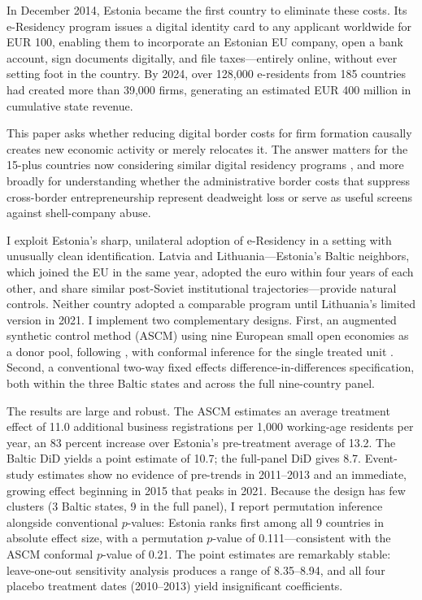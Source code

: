 \documentclass[12pt]{article}
\begin{document}
In December 2014, Estonia became the first country to eliminate these costs. Its e-Residency program issues a digital identity card to any applicant worldwide for EUR 100, enabling them to incorporate an Estonian EU company, open a bank account, sign documents digitally, and file taxes---entirely online, without ever setting foot in the country. By 2024, over 128,000 e-residents from 185 countries had created more than 39,000 firms, generating an estimated EUR 400 million in cumulative state revenue.

This paper asks whether reducing digital border costs for firm formation causally creates new economic activity or merely relocates it. The answer matters for the 15-plus countries now considering similar digital residency programs \citep{oecd2020digital}, and more broadly for understanding whether the administrative border costs that suppress cross-border entrepreneurship represent deadweight loss or serve as useful screens against shell-company abuse.

I exploit Estonia's sharp, unilateral adoption of e-Residency in a setting with unusually clean identification. Latvia and Lithuania---Estonia's Baltic neighbors, which joined the EU in the same year, adopted the euro within four years of each other, and share similar post-Soviet institutional trajectories---provide natural controls. Neither country adopted a comparable program until Lithuania's limited version in 2021. I implement two complementary designs. First, an augmented synthetic control method (ASCM) using nine European small open economies as a donor pool, following \citet{benmelech2021}, with conformal inference for the single treated unit \citep{chernozhukov2021}. Second, a conventional two-way fixed effects difference-in-differences specification, both within the three Baltic states and across the full nine-country panel.

The results are large and robust. The ASCM estimates an average treatment effect of 11.0 additional business registrations per 1,000 working-age residents per year, an 83 percent increase over Estonia's pre-treatment average of 13.2. The Baltic DiD yields a point estimate of 10.7; the full-panel DiD gives 8.7. Event-study estimates show no evidence of pre-trends in 2011--2013 and an immediate, growing effect beginning in 2015 that peaks in 2021. Because the design has few clusters (3 Baltic states, 9 in the full panel), I report permutation inference alongside conventional $p$-values: Estonia ranks first among all 9 countries in absolute effect size, with a permutation $p$-value of 0.111---consistent with the ASCM conformal $p$-value of 0.21. The point estimates are remarkably stable: leave-one-out sensitivity analysis produces a range of 8.35--8.94, and all four placebo treatment dates (2010--2013) yield insignificant coefficients.
\end{document}
